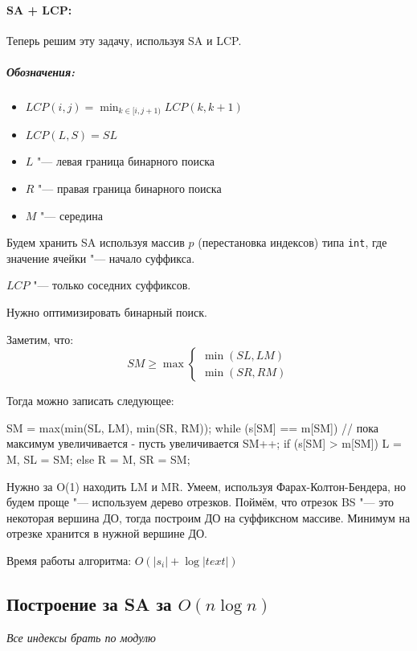 \paragraph{SA + LCP:}

Теперь решим эту задачу, используя SA и LCP.

\subparagraph{Обозначения:}
\begin{itemize}
	\item	$LCP(i, j) = \min_{k \in [i, j + 1)} LCP(k, k + 1)$
	\item $LCP(L, S) = SL$	
	\item $L$ "--- левая граница бинарного поиска
	\item $R$ "--- правая граница бинарного поиска
	\item $M$ "--- середина
\end{itemize}

Будем хранить SA используя массив $p$ (перестановка индексов) типа \texttt{int}, где значение ячейки "--- начало суффикса.

$LCP$ "--- только соседних суффиксов.

Нужно оптимизировать бинарный поиск.

Заметим, что:
 \begin{equation*}
	SM \geq \max
		 \begin{cases}
		  	\min(SL, LM) \\
		   	\min(SR, RM)
		 \end{cases}
\end{equation*}
 
Тогда можно записать следующее:

\begin{cppcode} 
 SM = max(min(SL, LM), min(SR, RM));
 while (s[SM] == m[SM]) {	// пока максимум увеличивается - пусть увеличивается
 	SM++;	
 	if (s[SM] > m[SM])
 		L = M, SL = SM;
 	else
 		R = M, SR = SM;
 }
 \end{cppcode}
 
Нужно за O(1) находить LM и MR. Умеем, используя Фарах-Колтон-Бендера, но будем проще "--- используем дерево отрезков.
Поймём, что отрезок BS "--- это некоторая вершина ДО, тогда построим ДО на суффиксном массиве. Минимум на отрезке хранится в нужной вершине ДО.

Время работы алгоритма: $O(|s_i| + \log |text|)$

\subsection{Построение за SA за \texorpdfstring{$O(n \log n)$}{O(n log n)}}
\textit{Все индексы брать по модулю}

